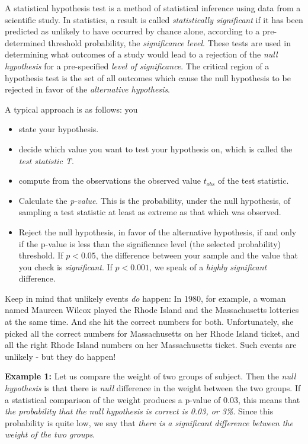 A statistical hypothesis test is a method of statistical inference using data from a scientific study. In statistics, a result is called \emph{statistically significant} if it has been predicted as unlikely to have occurred by chance alone, according to a pre-determined threshold probability, the \emph{significance level}. These tests are used in determining what outcomes of a study would lead to a rejection of the \emph{null hypothesis} for a pre-specified \emph{level of significance}. The critical region of a hypothesis test is the set of all outcomes which cause the null hypothesis to be rejected in favor of the \emph{alternative hypothesis}.

A typical approach is as follows: you

\begin{itemize}
  \item   state your hypothesis.
  \item   decide which value you want to test your hypothesis on, which is called the \emph{test statistic T}.
  \item   compute from the observations the observed value $t_{obs}$ of the test statistic.
  \item   Calculate the \emph{p-value}. This is the probability, under the null hypothesis, of sampling a test statistic at least as extreme as that which was observed.
  \item   Reject the null hypothesis, in favor of the alternative hypothesis, if and only if the p-value is less than the significance level (the selected probability) threshold. If $p<0.05$, the difference between your sample and the value that you check is \emph{significant}. If $p<0.001$, we speak of a \emph{highly significant} difference.
\end{itemize}

Keep in mind that unlikely events \emph{do} happen: In 1980, for example, a woman named Maureen Wilcox played the Rhode Island and the Massachusetts lotteries at the same time. And she hit the correct numbers for both. Unfortunately, she picked all the correct numbers for Massachusetts on her Rhode Island ticket, and all the right Rhode Island numbers on her Massachusetts ticket. Such events are unlikely - but they do happen!


\textbf{Example 1: } Let us compare the weight of two groups of subject. Then the \emph{null hypothesis} is that there is \emph{null} difference in the weight between the two groups. If a statistical comparison of the weight produces a p-value of 0.03, this means that \emph{the probability that the null hypothesis is correct is 0.03, or 3\%}. Since this probability is quite low, we say that \emph{there is a significant difference between the weight of the two groups}.

